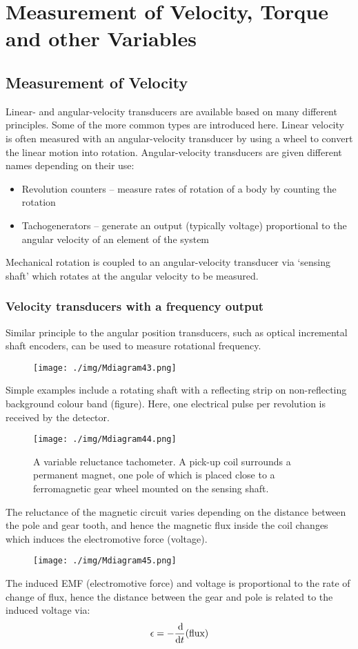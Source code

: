 \chapter{Measurement of Velocity, Torque and other Variables}
\section{Measurement of Velocity}
Linear- and angular-velocity transducers are available based on many different principles. Some of the more common types are introduced here. Linear velocity is often measured with an angular-velocity transducer by using a wheel to convert the linear motion into rotation. Angular-velocity transducers are given different names depending on their use:
\begin{itemize}
  \item Revolution counters – measure rates of rotation of a body by counting the rotation
  \item Tachogenerators – generate an output (typically voltage) proportional to the angular velocity of an element of the system
\end{itemize}
Mechanical rotation is coupled to an angular-velocity transducer via ‘sensing shaft’ which rotates at the angular velocity to be measured.
\subsection{Velocity transducers with a frequency output}
Similar principle to the angular position transducers, such as optical incremental shaft encoders, can be used to measure rotational frequency.
\begin{figure}[H]
  \centering
  \texttt{[image: ./img/Mdiagram43.png]}
\end{figure}
Simple examples include a rotating shaft with a reflecting strip on non-reflecting background colour band (figure). Here, one electrical pulse per revolution is received by the detector.
\begin{figure}[H]
  \centering
  \texttt{[image: ./img/Mdiagram44.png]}
  \caption{A variable reluctance tachometer. A pick-up coil surrounds a permanent magnet, one pole of which is placed close to a ferromagnetic gear wheel mounted on the sensing shaft.}
\end{figure}
The reluctance of the magnetic circuit varies depending on the distance between the pole and gear tooth, and hence the magnetic flux inside the coil changes which induces the electromotive force (voltage).
\begin{figure}[H]
  \centering
  \texttt{[image: ./img/Mdiagram45.png]}
\end{figure}
The induced EMF (electromotive force) and voltage is proportional to the rate of change of flux, hence the distance between the gear and pole is related to the induced voltage via:
\begin{gather}
  \epsilon = -\frac{\dif}{\dif t}\text{(flux)}
\end{gather}
